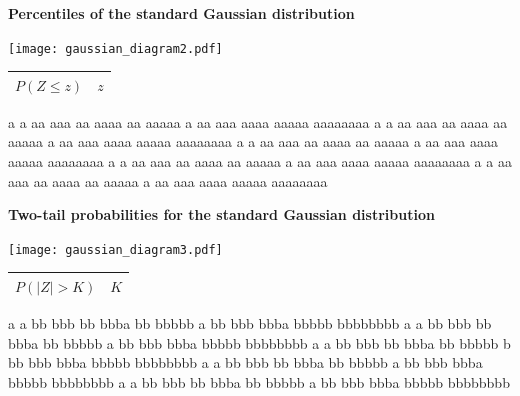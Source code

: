 \documentclass[a4paper]{article}
\begin{document}
\begin{minipage}[t]{7cm}
  \begin{center}
    {\Large\bf Percentiles of the standard Gaussian distribution}
    
    \texttt{[image: gaussian\_diagram2.pdf]}

    \begin{tabular}{l|r}\hline
      $P\left(Z\leqslant z\right)$ & $z$\\
      \hline
      
      \hline
    \end{tabular}
  \end{center}
  
a a aa aaa aa aaaa aa aaaaa a aa aaa aaaa aaaaa aaaaaaaa 
a a aa aaa aa aaaa aa aaaaa a aa aaa aaaa aaaaa aaaaaaaa 
a a aa aaa aa aaaa aa aaaaa a aa aaa aaaa aaaaa aaaaaaaa 
a a aa aaa aa aaaa aa aaaaa a aa aaa aaaa aaaaa aaaaaaaa 
a a aa aaa aa aaaa aa aaaaa a aa aaa aaaa aaaaa aaaaaaaa 
\end{minipage}\hfill
\begin{minipage}[t]{7cm}
  \begin{center}
    {\Large\bf Two-tail probabilities for the standard Gaussian distribution}

    \texttt{[image: gaussian\_diagram3.pdf]}

    \begin{tabular}{l|r}\hline
      $P\left(\left|Z\right| >  K\right)$ & $K$\\
      \hline
      
      \hline
    \end{tabular}



  \end{center}
a a bb bbb bb bbba bb bbbbb a bb bbb bbba bbbbb bbbbbbbb 
a a bb bbb bb bbba bb bbbbb a bb bbb bbba bbbbb bbbbbbbb 
a a bb bbb bb bbba bb bbbbb b bb bbb bbba bbbbb bbbbbbbb 
a a bb bbb bb bbba bb bbbbb a bb bbb bbba bbbbb bbbbbbbb 
a a bb bbb bb bbba bb bbbbb a bb bbb bbba bbbbb bbbbbbbb 
\end{minipage}



\end{document}
